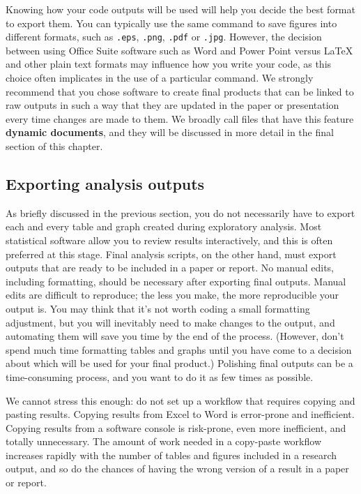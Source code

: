 
Knowing how your code outputs will be used will help you decide the best format to export them.
You can typically use the same command to save figures into different formats,
such as \texttt{.eps}, \texttt{.png}, \texttt{.pdf} or \texttt{.jpg}.
However, the decision between using Office Suite software such as Word and Power Point
versus {\LaTeX} and other plain text formats may influence how you write your code,
as this choice often implicates in the use of a particular command.
We strongly recommend that you chose software to create final products
that can be linked to raw outputs in such a way that they are updated
in the paper or presentation every time changes are made to them.
We broadly call files that have this feature \textbf{dynamic documents},
and they will be discussed in more detail in the final section of this chapter.


\subsection{Exporting analysis outputs}

As briefly discussed in the previous section,
you do not necessarily have to export each and every table and graph
created during exploratory analysis.
Most statistical software allow you to review results interactively,
and this is often preferred at this stage.
Final analysis scripts, on the other hand, must export outputs
that are ready to be included in a paper or report.
No manual edits, including formatting,
should be necessary after exporting final outputs.
Manual edits are difficult to reproduce;
the less you make, the more reproducible your output is.
You may think that it's not worth coding a small formatting adjustment,
but you will inevitably need to make changes to the output,
and automating them will save you time by the end of the process.
(However, don't spend much time formatting tables and graphs until
you have come to a decision about which will be used for your final product.)
Polishing final outputs can be a time-consuming process,
and you want to do it as few times as possible.

We cannot stress this enough:
do not set up a workflow that requires copying and pasting results.
Copying results from Excel to Word is error-prone and inefficient.
Copying results from a software console is risk-prone,
even more inefficient, and totally unnecessary.
The amount of work needed in a copy-paste workflow increases
rapidly with the number of tables and figures included in a research output,
and so do the chances of having the wrong version of a result in a paper or report.

